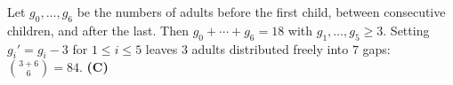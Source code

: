 Let $g_0,\dots,g_6$ be the numbers of adults before the first child, between consecutive children, and after the last. Then $g_0+\cdots+g_6=18$ with $g_1,\dots,g_5\ge3$. Setting $g_i'=g_i-3$ for $1\le i\le5$ leaves $3$ adults distributed freely into $7$ gaps: $\binom{3+6}6=84$. \textbf{(C)}
